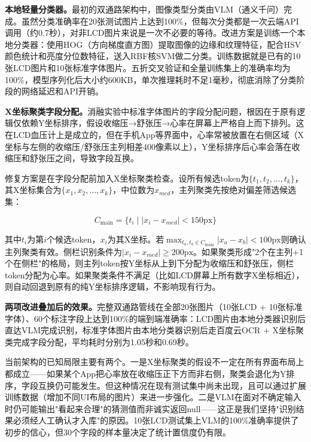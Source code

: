 \documentclass[zihao=-4,a4paper]{ctexart}
\begin{document}
\textbf{本地轻量分类器。}最初的双通路架构中，图像类型分类由VLM（通义千问）完成。虽然分类准确率在20张测试图片上达到100\%，但每次分类都是一次云端API调用（约0.7秒），对非LCD图片来说是一次不必要的等待。改进方案是训练一个本地分类器：使用HOG（方向梯度直方图）提取图像的边缘和纹理特征，配合HSV颜色统计和亮度分位数特征，送入RBF核SVM做二分类。训练数据就是已有的10张LCD图片和10张标准字体图片。五折交叉验证和全量训练集上的准确率均为100\%，模型序列化后大小约600KB，单次推理耗时不足1毫秒，彻底消除了分类阶段的网络延迟和API开销。

\textbf{X坐标聚类字段分配。}消融实验中标准字体图片的字段分配问题，根因在于原有逻辑仅依赖Y坐标排序，假设收缩压→舒张压→心率在屏幕上严格自上而下排列。这在LCD血压计上是成立的，但在手机App等界面中，心率常被放置在右侧区域（X坐标与左侧的收缩压/舒张压主列相差400像素以上），Y坐标排序后心率会落在收缩压和舒张压之间，导致字段互换。

修复方案是在字段分配前加入X坐标聚类检查。设所有候选token为$\{t_1, t_2, \ldots, t_k\}$，其X坐标集合为$\{x_1, x_2, \ldots, x_k\}$，中位数为$x_{med}$，主列聚类先按绝对偏差筛选候选集：

\begin{equation}
C_{\text{main}} = \{t_i \mid |x_i - x_{med}| < 150\text{px}\}
\end{equation}

其中$t_i$为第$i$个候选token，$x_i$为其X坐标。若$\max_{t_a,t_b \in C_{\text{main}}} |x_a - x_b| < 100\text{px}$则确认主列聚类有效。侧栏识别条件为$|x_i - x_{med}| \geq 200\text{px}$。如果聚类形成"2个在主列+1个在侧栏"的格局，则主列token按Y坐标从上到下分配为收缩压和舒张压，侧栏token分配为心率。如果聚类条件不满足（比如LCD屏幕上所有数字X坐标相近），则自动回退到原有的纯Y坐标排序逻辑，不影响现有行为。

\textbf{两项改进叠加后的效果。}完整双通路管线在全部20张图片（10张LCD + 10张标准字体）、60个标注字段上达到100\%的端到端准确率：LCD图片由本地分类器识别后直达VLM完成识别，标准字体图片由本地分类器识别后走百度云OCR + X坐标聚类完成字段分配，平均耗时分别为1.05秒和0.69秒。

当前架构的已知局限主要有两个。一是X坐标聚类的假设不一定在所有界面布局上都成立——如果某个App把心率放在收缩压正下方而非右侧，聚类会退化为Y排序，字段互换仍可能发生。但这种情况在现有测试集中尚未出现，且可以通过扩展训练数据（增加不同UI布局的图片）来进一步强化。二是VLM在面对不确定输入时仍可能输出"看起来合理"的猜测值而非诚实返回null——这正是我们坚持"识别结果必须经人工确认才入库"的原因。10张LCD测试集上VLM的100\%准确率提供了初步的信心，但30个字段的样本量决定了统计置信度仍有限。
\end{document}
